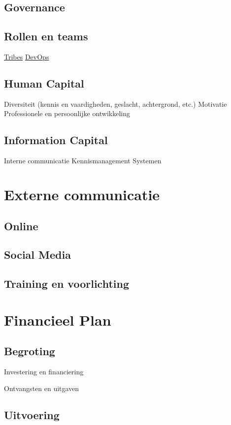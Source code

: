 \documentclass[]{book}
\begin{document}
\section{Governance}\label{governance}

\section{Rollen en teams}\label{rollen-en-teams}

\href{https://techbeacon.com/teams-tribes-creating-one-team-culture-devops}{Tribes}
\href{https://en.wikipedia.org/wiki/DevOps}{DevOps}

\section{Human Capital}\label{human-capital}

Diversiteit (kennis en vaardigheden, geslacht, achtergrond, etc.)
Motivatie Professionele en persoonlijke ontwikkeling

\section{Information Capital}\label{information-capital}

Interne communicatie Kennismanagement Systemen

\chapter{Externe communicatie}\label{externe-communicatie}

\section{Online}\label{online}

\section{Social Media}\label{social-media}

\section{Training en voorlichting}\label{training-en-voorlichting}

\chapter{Financieel Plan}\label{financieel-plan}

\section{Begroting}\label{begroting}

Investering en financiering

Ontvangsten en uitgaven

\section{Uitvoering}\label{uitvoering}


\end{document}

